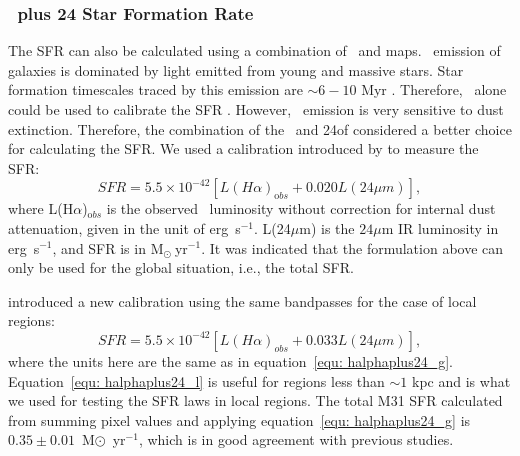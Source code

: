 \subsubsection{\halpha\ plus 24 \um Star Formation Rate}
\label{sec:sfr_halpha}

The SFR can also be calculated using a combination of \halpha\ and  \um maps. \halpha\ emission of galaxies is dominated by light emitted from young and massive stars. Star formation timescales traced by this emission are $\sim 6-10$ Myr \citep[e.g.][]{Kennicutt09, Calzetti13}. Therefore, \halpha\ alone could be used to calibrate the SFR \citep[e.g.][]{Osterbrock06, Kennicutt09}. However, \halpha\ emission is very sensitive to dust extinction. Therefore, the combination of the \halpha\ and 24\um of considered a better choice for calculating the SFR. We used a calibration introduced by \citet{Kennicutt09} to measure the SFR:
\begin{equation}
\label{equ: halphaplus24_g}
SFR = 5.5 \times 10^{-42}[L(H{\alpha})_{\mathrm obs} + 0.020L(24\mu m)],
\end{equation}
\noindent where L(H${\alpha}$)$_{\mathrm obs}$ is the observed \halpha\ luminosity without correction for internal dust attenuation, given in the unit of erg~s$^{-1}$. L(24$\mu$m) is the $24\mu$m IR luminosity in erg~s$^{-1}$, and SFR is in M$_{\odot}~$yr$^{-1}$. It was indicated that the formulation above can only be used for the global situation, i.e., the total SFR.

\citet{Calzetti07} introduced a new calibration using the same bandpasses for the case of local regions:
\begin{equation}
\label{equ: halphaplus24_l}
SFR = 5.5 \times 10^{-42}[L(H{\alpha})_{obs} + 0.033L(24\mu m)],
\end{equation}
\noindent where the units here are the same as in equation~\ref{equ: halphaplus24_g}. Equation~\ref{equ: halphaplus24_l} is useful for regions less than $\sim 1$ kpc and is what we used for testing the SFR laws in local regions. The total M31 SFR calculated from summing pixel values and applying equation~\ref{equ: halphaplus24_g} is $0.35 \pm 0.01$~M$\odot$~yr$^{-1}$, which is in good agreement with previous studies.

